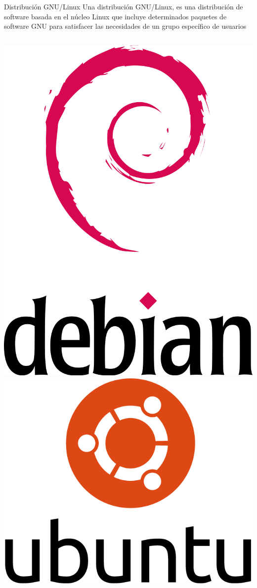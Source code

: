 \documentclass{beamer}
\begin{document}
\begin{frame}{Distribución GNU/Linux}
Una distribución GNU/Linux, es una distribución de software basada en el núcleo Linux que incluye determinados paquetes de software GNU para satisfacer las necesidades de un grupo específico de usuarios

\begin{columns}[t]
\centering
\includegraphics[scale=0.08]{debian.png}\\
\includegraphics[scale=0.08]{ubuntu.png}

\end{columns}
\end{frame}
\end{document}
